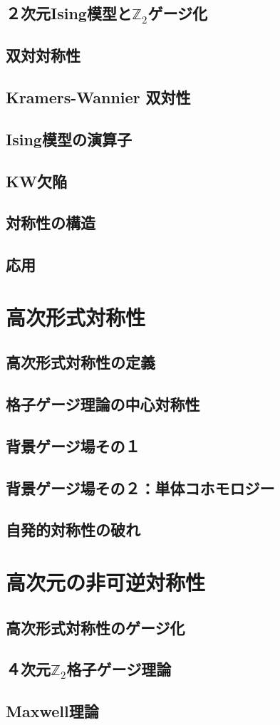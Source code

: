 \documentclass[report,paper=a4, fontsize=12pt, line_length=16cm, number_of_lines=33,dvipdfmx]{jlreq}
\numberwithin{equation}{chapter}
\newcommand{\Ztwo}{\mbox{$\mathbb{Z}_{2}$}}
\begin{document}
\section{２次元Ising模型と\texorpdfstring{\Ztwo}{Z2}ゲージ化}
\section{双対対称性}
\section{Kramers-Wannier 双対性}
\section{Ising模型の演算子}
\section{KW欠陥}
\section{対称性の構造}
\section{応用}


\chapter{高次形式対称性}
\section{高次形式対称性の定義}
\section{格子ゲージ理論の中心対称性}
\section{背景ゲージ場その１}
\section{背景ゲージ場その２：単体コホモロジー}
\section{自発的対称性の破れ}


\chapter{高次元の非可逆対称性}
\section{高次形式対称性のゲージ化}
\section{４次元\texorpdfstring{\Ztwo}{Z2}格子ゲージ理論}
\section{Maxwell理論}



\end{document}
